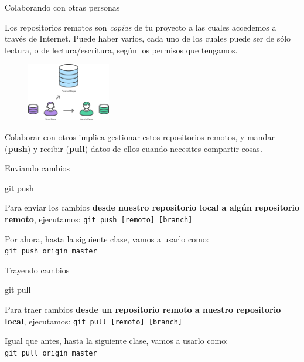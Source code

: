 \begin{frame}{Colaborando con otras personas}

    Los repositorios remotos son \textit{copias} de tu proyecto a las cuales accedemos a través
    de Internet. Puede haber varios, cada uno de los cuales
    puede ser de sólo lectura, o de lectura/escritura, según los permisos que tengamos.

    \begin{figure}[ht]
        \begin{center}
            \includegraphics[height=1in]{images/repo-remoto.png}
        \end{center}
    \end{figure}

    Colaborar con otros implica gestionar estos repositorios remotos, y mandar (\textbf{push}) y recibir (\textbf{pull})
    datos de ellos cuando necesites compartir cosas.

\end{frame}

\begin{frame}[t]{Enviando cambios}
    \begin{comando}
        git push
    \end{comando}

    \pause
    \begin{block}{}
        Para enviar los cambios \textbf{desde nuestro repositorio local a algún
        repositorio remoto}, ejecutamos: \texttt{git push [remoto] [branch]}

        \vspace{0.5em}

        Por ahora, hasta la siguiente clase, vamos a usarlo como:\\ \texttt{git push origin master}
    \end{block}
\end{frame}

\begin{frame}[t]{Trayendo cambios}
    \begin{comando}
        git pull
    \end{comando}

    \pause
    \begin{block}{}
        Para traer cambios \textbf{desde un repositorio remoto a nuestro repositorio local},
        ejecutamos: \texttt{git pull [remoto] [branch]}

        \vspace{0.5em}

        Igual que antes, hasta la siguiente clase, vamos a usarlo como:\\ \texttt{git pull origin master}
    \end{block}
\end{frame}

